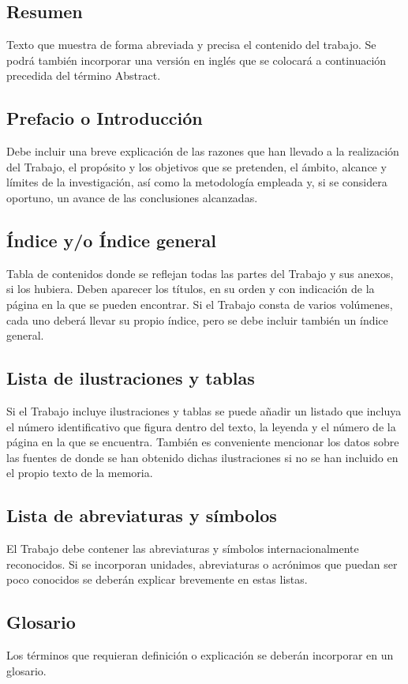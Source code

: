 \subsection{Resumen} 
Texto que muestra de forma abreviada y precisa el contenido del trabajo. Se podrá también incorporar una versión en inglés que se colocará a continuación precedida del término Abstract.
\subsection{Prefacio o Introducción}
Debe incluir una breve explicación de las razones que han llevado a la realización del Trabajo, el propósito y los objetivos que se pretenden, el ámbito, alcance y límites de la investigación, así como la metodología empleada y, si se considera oportuno, un avance de las conclusiones alcanzadas.  

\subsection{Índice y/o Índice general}
Tabla de contenidos donde se reflejan todas las partes del Trabajo y sus anexos, si los hubiera. Deben aparecer los títulos, en su orden y con indicación de la página en la que se pueden encontrar.
Si el Trabajo consta de varios volúmenes, cada uno deberá llevar su propio índice, pero se debe incluir también un índice general.
\subsection{Lista de ilustraciones y tablas}
Si el Trabajo incluye ilustraciones y tablas se puede añadir un listado que incluya el número identificativo que figura dentro del texto, la leyenda y el número de la página en la que se encuentra.
También es conveniente mencionar los datos sobre las fuentes de donde se han obtenido dichas ilustraciones si no se han incluido en el propio texto de la memoria.
\subsection{Lista de abreviaturas y símbolos}
El Trabajo debe contener las abreviaturas y símbolos internacionalmente reconocidos. Si se incorporan unidades, abreviaturas o acrónimos que puedan ser poco conocidos se deberán explicar brevemente en estas listas.
\subsection{Glosario}
Los términos que requieran definición o explicación se deberán incorporar en un glosario.
